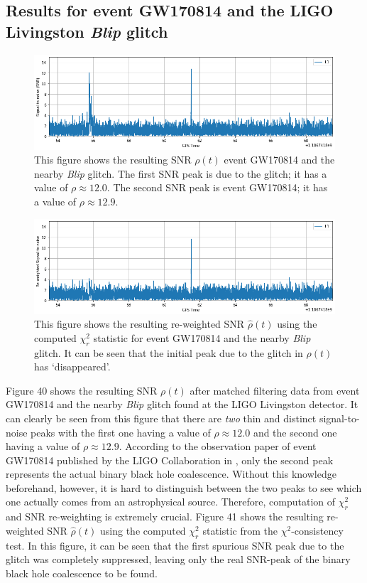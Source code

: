 \documentclass[preprint,
letterpaper,
 amsmath,amssymb,
 aps,
]{revtex4-2}
\begin{document}
\subsection{Results for event GW170814 and the LIGO Livingston \textit{Blip} glitch}

\begin{figure}
\includegraphics[width = .9\textwidth]{blip orig snr.png}
\caption{This figure shows the resulting SNR $\rho(t)$ event GW170814 and the nearby \textit{Blip} glitch. The first SNR peak is due to the glitch; it has a value of $\rho\approx12.0$. The second SNR peak is event GW170814; it has a value of $\rho\approx12.9$.}
\centering
\end{figure} 

\begin{figure}[t]
\includegraphics[width = .9\textwidth]{blip reweighted.png}
\caption{This figure shows the resulting re-weighted SNR $\hat{\rho}(t)$ using the computed $\chi^2_r$ statistic for event GW170814 and the nearby \textit{Blip} glitch. It can be seen that the initial peak due to the glitch in $\rho(t)$ has `disappeared'.}
\centering
\end{figure}

Figure 40 shows the resulting SNR $\rho(t)$ after matched filtering data from event GW170814 and the nearby \textit{Blip} glitch found at the LIGO Livingston detector. It can clearly be seen from this figure that there are \textit{two} thin and distinct signal-to-noise peaks with the first one having a value of $\rho\approx 12.0$ and the second one having a value of $\rho\approx 12.9$. According to the observation paper of event GW170814 published by the LIGO Collaboration in \cite{blip}, only the second peak represents the actual binary black hole coalescence. Without this knowledge beforehand, however, it is hard to distinguish between the two peaks to see which one actually comes from an astrophysical source. Therefore, computation of $\chi_r^2$ and SNR re-weighting is extremely crucial. Figure 41 shows the resulting re-weighted SNR $\hat{\rho}(t)$ using the computed $\chi_r^2$ statistic from the $\chi^2$-consistency test. In this figure, it can be seen that the first spurious SNR peak due to the glitch was completely suppressed, leaving only the real SNR-peak of the binary black hole coalescence to be found. 
\end{document}
